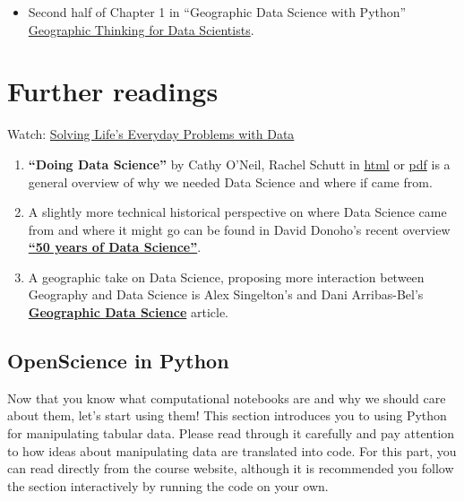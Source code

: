 \documentclass[
  letterpaper,
  DIV=11,
  numbers=noendperiod]{scrreprt}
\providecommand{\tightlist}{%
  \setlength{\itemsep}{0pt}\setlength{\parskip}{0pt}}\usepackage{longtable,booktabs,array}
\begin{document}
\begin{itemize}
\tightlist
\item
  Second half of Chapter 1 in ``Geographic Data Science with Python''
  \href{https://geographicdata.science/book/notebooks/01_geo_thinking.html}{Geographic
  Thinking for Data Scientists}.
\end{itemize}

\part{\textbf{Further readings}}

Watch:
\href{https://www.sciencefriday.com/segments/solving-lifes-everyday-problems-with-data/}{Solving
Life's Everyday Problems with Data}

\begin{enumerate}
\def\labelenumi{\arabic{enumi}.}
\item
  \textbf{``Doing Data Science''} by Cathy O'Neil, Rachel Schutt in
  \href{http://shop.oreilly.com/product/0636920028529.do}{html} or
  \href{http://cdn.oreillystatic.com/oreilly/booksamplers/9781449358655_sampler.pdf}{pdf}
  is a general overview of why we needed Data Science and where if came
  from.
\item
  A slightly more technical historical perspective on where Data Science
  came from and where it might go can be found in David Donoho's recent
  overview
  \href{https://www.tandfonline.com/doi/full/10.1080/10618600.2017.1384734}{\textbf{``50
  years of Data Science''}}.
\item
  A geographic take on Data Science, proposing more interaction between
  Geography and Data Science is Alex Singelton's and Dani Arribas-Bel's
  \href{https://onlinelibrary.wiley.com/doi/full/10.1111/gean.12194}{\textbf{Geographic
  Data Science}} article.
\end{enumerate}

\chapter*{OpenScience in Python}\label{sec-open-science-Python}


Now that you know what computational notebooks are and why we should
care about them, let's start using them! This section introduces you to
using Python for manipulating tabular data. Please read through it
carefully and pay attention to how ideas about manipulating data are
translated into code. For this part, you can read directly from the
course website, although it is recommended you follow the section
interactively by running the code on your own.
\end{document}
